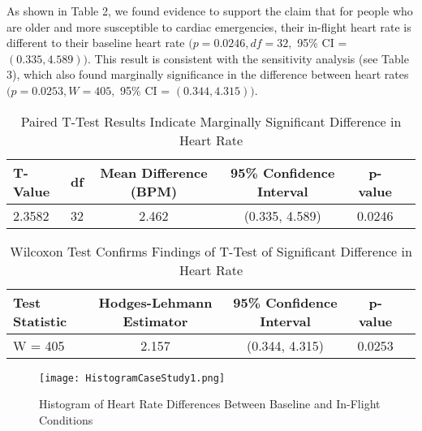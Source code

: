 \documentclass{article}
\begin{document}
\begin{enumerate}
		As shown in Table 2, we found evidence to support the claim that for people who are older and more susceptible to cardiac emergencies, their in-flight heart rate is different to their baseline heart rate $(p = 0.0246, df = 32,$ 95\% CI = $(0.335, 4.589))$. This result is consistent with the sensitivity analysis (see Table 3), which also found marginally significance in the difference between heart rates $(p = 0.0253, W = 405,$ 95\% CI = $(0.344, 4.315))$.

		\begin{table}[h!]
			\centering
			\footnotesize
			\caption{Paired T-Test Results Indicate Marginally Significant Difference in Heart Rate}
			\label{tab:t_test_results}
			\begin{tabular}{lccccc}
			\toprule
			\textbf{T-Value}  & \textbf{df} & \textbf{Mean Difference (BPM)} & \textbf{95\% Confidence Interval} & \textbf{p-value} \\
			\midrule
			2.3582      & 32          & 2.462                     & (0.335, 4.589)                    & 0.0246            \\
			\bottomrule
			\end{tabular}
		\end{table}

		\begin{table}[h!]
			\centering
			\footnotesize
			\caption{Wilcoxon Test Confirms Findings of T-Test of Significant Difference in Heart Rate}
			\label{tab:wilcoxon_results}
			\begin{tabular}{lcccc}
			\toprule
			\textbf{Test Statistic} & \textbf{Hodges-Lehmann Estimator} & \textbf{95\% Confidence Interval} & \textbf{p-value} \\
			\midrule
			W = 405                 & 2.157                           & (0.344, 4.315)                    & 0.0253            \\
			\bottomrule
			\end{tabular}
		\end{table}

			\newpage
			
			
			
			

			\begin{figure}[h!]
				\centering
				\texttt{[image: HistogramCaseStudy1.png]}
				\caption{Histogram of Heart Rate Differences Between Baseline and In-Flight Conditions}
				\label{fig:histogram}
			\end{figure}


\end{enumerate}
\end{document}
